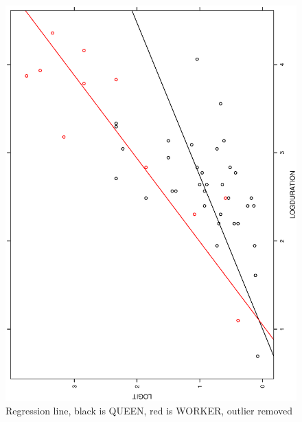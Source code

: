\documentclass[a4paper,10pt]{article}
\begin{document}
\begin{figure}
\includegraphics[angle=-90, width=1\textwidth]{figures/math650_hw7_fig6.eps}
\caption{Regression line, black is QUEEN, red is WORKER, outlier removed}\label{f6}
\end{figure}
\end{document}
